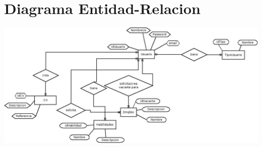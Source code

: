 \newpage


\section{Diagrama Entidad-Relacion}
\begin{center}
	\includegraphics[scale=0.6]{./resources/eer.jpg}
\end{center}